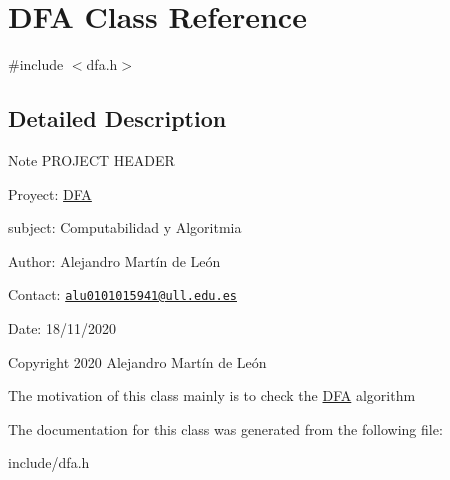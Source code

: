 \hypertarget{classDFA}{}\section{D\+FA Class Reference}
\label{classDFA}


{\ttfamily \#include $<$dfa.\+h$>$}



\subsection{Detailed Description}
\begin{DoxyNote}{Note}
P\+R\+O\+J\+E\+CT H\+E\+A\+D\+ER 

Proyect\+: \hyperlink{classDFA}{D\+FA} 

subject\+: Computabilidad y Algoritmia 

Author\+: Alejandro Martín de León 

Contact\+: \href{mailto:alu0101015941@ull.edu.es}{\tt alu0101015941@ull.\+edu.\+es} 

Date\+: 18/11/2020 

Copyright 2020 Alejandro Martín de León
\end{DoxyNote}
The motivation of this class mainly is to check the \hyperlink{classDFA}{D\+FA} algorithm 

The documentation for this class was generated from the following file\+:\begin{DoxyCompactItemize}
\item 
include/dfa.\+h\end{DoxyCompactItemize}
